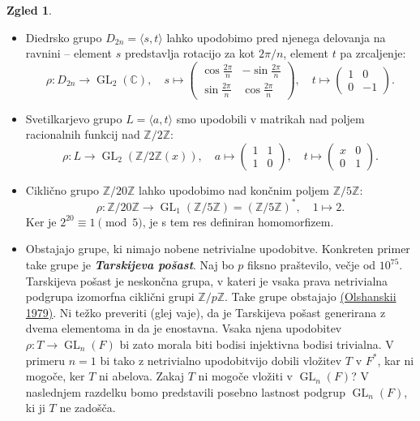 \documentclass[11pt]{book}
\def\ZZ{\mathbb{Z}}
\def\CC{\mathbb{C}}
\DeclareMathOperator\GL{GL}
\def\definicija{\color{rdeca}\bf\em}
\def\vprasanje{\color{oranzna}}
\def\literatura{\color{modra}}
\def\vaje{{\literatura (glej vaje)}}
\theoremstyle{definition}
\theoremstyle{zgled}
\newtheorem*{zgled}{Zgled}
\theoremstyle{odprtproblem}
\theoremstyle{domacanaloga}
\theoremstyle{izrek}
\begin{document}
\begin{zgled}
\begin{itemize}
    \item Diedrsko grupo $D_{2n} = \langle s, t \rangle$ lahko upodobimo pred njenega delovanja na ravnini -- element $s$ predstavlja rotacijo za kot $2 \pi/n$, element $t$ pa zrcaljenje:
    \[
    \rho \colon D_{2n} \to \GL_2(\CC), \quad
    s \mapsto \begin{pmatrix} \cos \frac{2 \pi}{n} & - \sin \frac{2 \pi}{n} \\ \sin \frac{2 \pi}{n} & \cos \frac{2 \pi}{n}  \end{pmatrix}, \quad
    t \mapsto  \begin{pmatrix} 1 & 0 \\ 0 & -1  \end{pmatrix}.
    \]

    \item Svetilkarjevo grupo $L = \langle a, t \rangle$ smo upodobili v matrikah nad poljem racionalnih funkcij nad $\ZZ/2\ZZ$:
    \[
    \rho \colon L \to \GL_2(\ZZ/2\ZZ(x)), \quad
    a \mapsto \begin{pmatrix} 1 & 1 \\ 1 & 0  \end{pmatrix}, \quad
    t \mapsto \begin{pmatrix} x & 0 \\ 0 & 1  \end{pmatrix}.
    \]

    \item Ciklično grupo $\ZZ/20\ZZ$ lahko upodobimo nad končnim poljem $\ZZ/5\ZZ$:
    \[
    \rho \colon \ZZ/20\ZZ \to \GL_1(\ZZ/5\ZZ) = (\ZZ/5\ZZ)^*, \quad
    1 \mapsto 2.
    \]
    Ker je $2^{20} \equiv 1 \pmod {5}$, je s tem res definiran homomorfizem.

    \item Obstajajo grupe, ki nimajo nobene netrivialne upodobitve. Konkreten primer take grupe je {\definicija Tarskijeva pošast}. Naj bo $p$ fiksno praštevilo, večje od $10^{75}$. Tarskijeva pošast je neskončna grupa, v kateri je vsaka prava netrivialna podgrupa izomorfna ciklični grupi $\ZZ/p\ZZ$. Take grupe obstajajo \href{http://www.mathnet.ru/php/archive.phtml?wshow=paper&jrnid=im&paperid=1668&option_lang=eng}{(Olshanskii 1979)}. Ni težko preveriti \vaje, da je Tarskijeva pošast generirana z dvema elementoma in da je enostavna. Vsaka njena upodobitev $\rho \colon T \to \GL_n(F)$ bi zato morala biti bodisi injektivna bodisi trivialna. V primeru $n = 1$ bi tako z netrivialno upodobitvijo dobili vložitev $T$ v $F^*$, kar ni mogoče, ker $T$ ni abelova. {\vprasanje Zakaj $T$ ni mogoče vložiti v $\GL_n(F)$?} V naslednjem razdelku bomo predstavili posebno lastnost podgrup $\GL_n(F)$, ki ji $T$ ne zadošča.
\end{itemize}
\end{zgled}
\end{document}
